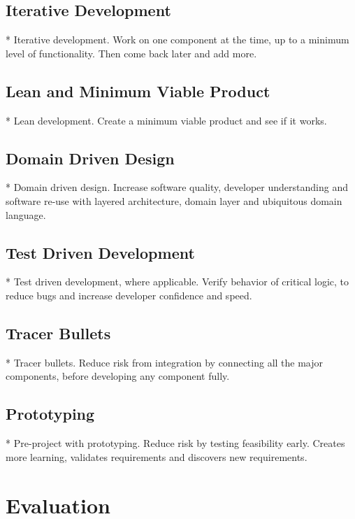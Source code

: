 \subsection{Iterative Development}
* Iterative development. Work on one component at the time, up to a minimum level of functionality. Then come back later and add more.


\subsection{Lean and Minimum Viable Product}

* Lean development. Create a minimum viable product and see if it works.

\subsection{Domain Driven Design}

* Domain driven design. Increase software quality, developer understanding and software re-use with layered architecture, domain layer and ubiquitous domain language.

\subsection{Test Driven Development}

* Test driven development, where applicable. Verify behavior of critical logic, to reduce bugs and increase developer confidence and speed.

\subsection{Tracer Bullets}
* Tracer bullets. Reduce risk from integration by connecting all the major components, before developing any component fully.

\subsection{Prototyping}

* Pre-project with prototyping. Reduce risk by testing feasibility early. Creates more learning, validates requirements and discovers new requirements.


\section{Evaluation}



